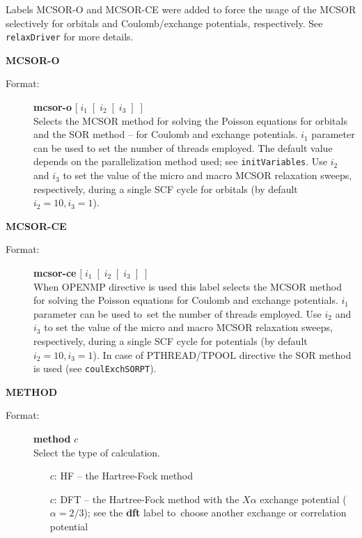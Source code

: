 \documentclass[10pt,a4paper]{article}
\newcommand{\ft}[1]{\texttt{#1}}
\newcommand{\fb}[1]{\textbf{#1}}
\begin{document}
\begin{description}
\begin{description}
  Labels MCSOR-O and MCSOR-CE were added to force the usage
  of the MCSOR selectively for orbitals and Coulomb/exchange potentials,
  respectively. See \ft{relaxDriver} for more details.
  
\end{description}

\item \textbf{MCSOR-O}
\begin{description}
\item[Format:] \textbf{mcsor-o} $[\;i_1\;[\;i_2\;[\;i_3\;]\;]$\\
  Selects the MCSOR method for solving the Poisson equations for orbitals
  and the SOR method -- for Coulomb and exchange potentials. $i_1$
  parameter can be used to set the number of threads employed. The default
  value depends on the parallelization method used; see
  \ft{initVariables}. Use $i_2$ and $i_3$ to set the value of the 
  micro and macro MCSOR relaxation sweeps, respectively, during a single SCF
  cycle for orbitals (by default  $i_2=10, i_3=1$).
\end{description}

\item \textbf{MCSOR-CE}
\begin{description}
\item[Format:] \textbf{mcsor-ce} $[\;i_1\;[\;i_2\;[\;i_3\;]\;]$\\
  When OPENMP directive is used this label selects the MCSOR method for
  solving the Poisson equations for Coulomb and exchange potentials.  $i_1$
  parameter can be used to~set the number of threads employed. Use $i_2$
  and $i_3$ to set the value of the micro and macro MCSOR relaxation
  sweeps, respectively, during a single SCF cycle for potentials (by
  default $i_2=10, i_3=1$). In case of PTHREAD/TPOOL directive the SOR
  method is used (see \ft{coulExchSORPT}).
\end{description}

\item \textbf{METHOD}
\begin{description}
\item[Format:] \textbf{method} $c$\\
Select the type of calculation.
\begin{itemize}
\item[$c$:] HF -- the Hartree-Fock method
\item[$c$:] DFT -- the Hartree-Fock method with the $X\alpha$ exchange
  potential ($\alpha=2/3$); see the \fb{dft} label to~choose another
  exchange or correlation potential


\end{itemize}
\end{description}
\end{description}
\end{document}
